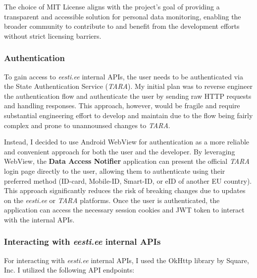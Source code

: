 The choice of MIT License aligns with the project's goal of providing a transparent and accessible solution for personal data monitoring, enabling the broader community to contribute to and benefit from the development efforts without strict licensing barriers.

\subsubsection{Authentication}
To gain access to \textit{eesti.ee} internal APIs, the user needs to be authenticated via the State Authentication Service (\textit{TARA}). My initial plan was to reverse engineer the authentication flow and authenticate the user by sending raw HTTP requests and handling responses. This approach, however, would be fragile and require substantial engineering effort to develop and maintain due to the flow being fairly complex and prone to unannounsed changes to \textit{TARA}.

Instead, I decided to use Android WebView for authentication as a more reliable and convenient approach for both the user and the developer. By leveraging WebView, the \textbf{Data Access Notifier} application can present the official \textit{TARA} login page directly to the user, allowing them to authenticate using their preferred method (ID-card, Mobile-ID, Smart-ID, or eID of another EU country). This approach significantly reduces the risk of breaking changes due to updates on the \textit{eesti.ee} or \textit{TARA} platforms. Once the user is authenticated, the application can access the necessary session cookies and JWT token to interact with the internal APIs.

\subsubsection{Interacting with \textit{eesti.ee} internal APIs}
For interacting with \textit{eesti.ee} internal APIs, I used the OkHttp library by Square, Inc\cite{okhttp-library}. I utilized the following API endpoints:


